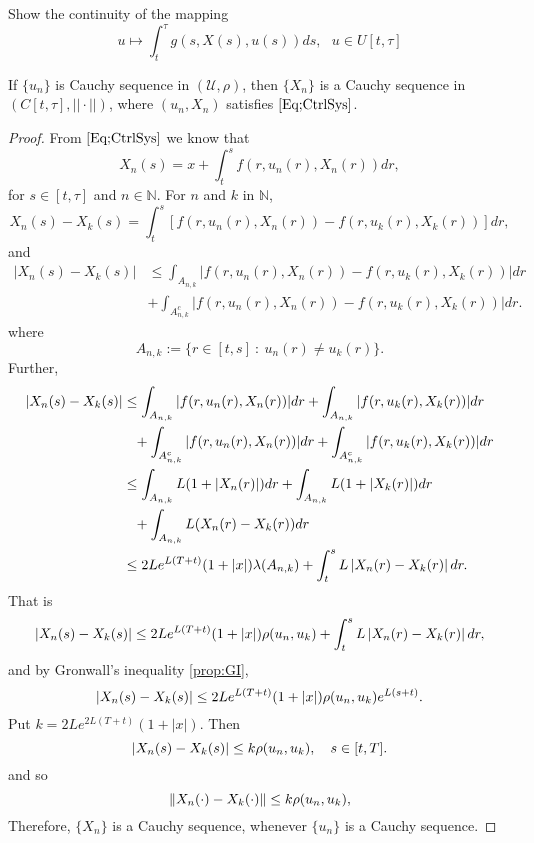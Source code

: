 
\begin{asparaenum}
    \item 
    Show the continuity of the mapping 
    $$
        u\mapsto \int_{t}^{\tau} g(s, X(s), u(s))ds, \ \ \ u\in U[t,\tau]
    $$
\end{asparaenum}

\begin{lemma}\label{Lemma0}
    If $\{ u_{n}\}$ is Cauchy sequence in $(\mathscr{U},\rho)$, then $\{ X_{n}\}$ 
    is a Cauchy sequence in $(C[t, \tau ], ||\cdot ||)$, where $(u_{n}, X_{n})$
    satisfies $\cref{Eq;CtrlSys}$.
\end{lemma}
\begin{proof}
    From $\cref{Eq;CtrlSys}$ we know that
    $$
        X_{n}(s)= x+\int_{t}^{s} f(r, u_{n}(r), X_{n}(r)) dr,
    $$
    for $s\in [t, \tau]$ and $n\in\mathbb{N}$. For $n$ and $k$ in $\mathbb{N}$,
    $$
        X_{n}(s)- X_{k}(s)= \int_{t}^{s}[f(r, u_{n}(r), X_{n}(r))-f(r, u_{k}(r),%
        X_{k}(r))] dr,
    $$
    and
    \begin{align*}
        |X_{n}(s)- X_{k}(s)| &\leq \int_{A_{n,k}}|f(r, u_{n}(r), X_{n}(r))- %
            f(r, u_{k}(r), X_{k}(r))|dr \\
        & +\int_{A_{n,k}^{c}}|f(r, u_{n}(r), X_{n}(r))-f(r, u_{k}(r), X_{k}(r))|dr.
    \end{align*}
    where 
    $$
        A_{n,k}:= \{ r\in[t,s] \ : \ u_{n}(r)\neq u_{k}(r) \}.
    $$
    Further,
    \begin{align*}
        |X_{n}(s)- X_{k}(s)| &\leq \int_{A_{n,k}}|f(r, u_{n}(r), X_{n}(r))|dr +
        \int_{A_{n,k}}|f(r, u_{k}(r), X_{k}(r))|dr \\
        &\phantom{=} +\int_{A_{n,k}^{c}}|f(r, u_{n}(r), X_{n}(r))|dr +
        \int_{A_{n,k}^{c}}|f(r, u_{k}(r), X_{k}(r))|dr \\
        &\leq \int_{A_{n,k}} L(1+|X_{n}(r)|)dr + \int_{A_{n,k}}L(1+|X_{k}(r)|)dr \\
        &\phantom{=}+ \int_{A_{n,k}} L(X_{n}(r)-X_{k}(r))dr \\
        &\leq 2Le^{L(T+t)}(1+|x|)\lambda(A_{n,k})+\int_{t}^{s} %
        L\abs{X_{n}(r)-X_{k}(r)}dr.
    \end{align*}
    That is
    $$
        \abs{X_{n}(s)-X_{k}(s)}\leq 2Le^{L(T+t)}(1+|x|)\rho(u_{n}, %
            u_{k})+\int_{t}^{s}L\abs{X_{n}(r)-X_{k}(r)}dr,
    $$
    and by Gronwall's inequality \eqref{prop:GI},
    $$
        \left\lvert X_{n}(s)-X_{k}(s)\right\rvert\leq 2Le^{L(T+t)}(1+|x|)\rho(u_{n}, u_{k})e^{L(s+t)}.
    $$
    Put $k=2Le^{2L(T+t)}(1+|x|)$. Then
    $$
        \left\lvert X_{n}(s)-X_{k}(s)\right\rvert\leq k\rho(u_{n}, u_{k}), \ \ \ s\in [t,T].
    $$
    and so
    $$
        \left\lVert X_{n}(\cdot)-X_{k}(\cdot)\right\rVert\leq k\rho(u_{n}, u_{k}),
    $$
    Therefore, $\{X_{n}\}$ is a Cauchy sequence, whenever $\{u_{n}\}$ is a Cauchy sequence.
\end{proof}

